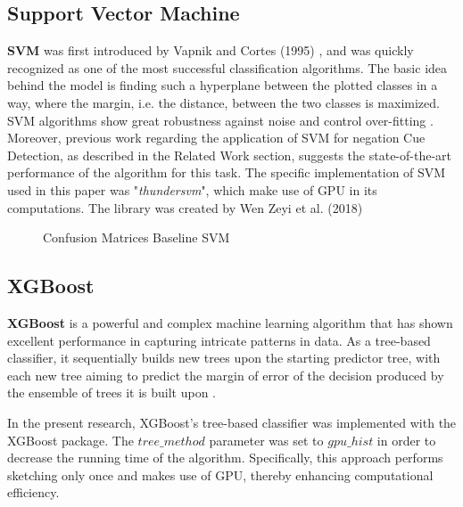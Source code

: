 \subsection{Support Vector Machine} 
\textbf{SVM} was first introduced by Vapnik and Cortes (1995) \cite{vapnik1995}, and was quickly recognized as one of the most successful classification algorithms. The basic idea behind the model is finding such a hyperplane between the plotted classes in a way, where the margin, i.e. the distance, between the two classes is maximized. SVM algorithms show great robustness against noise and control over-fitting \cite{robust2009}. Moreover, previous work regarding the application of SVM for negation Cue Detection, as described in the Related Work section, suggests the state-of-the-art performance of the algorithm for this task. The specific implementation of SVM used in this paper was  "\textit{thundersvm}", which make use of GPU in its computations. The library was created by Wen Zeyi et al. (2018) \cite{thundersvm}

\begin{figure}[!ht]
\centering
  \caption{Confusion Matrices Baseline SVM}
  \label{fig:base_line_svm}
\end{figure}

\subsection{XGBoost}
\textbf{XGBoost} is a powerful and complex machine learning algorithm that has shown excellent performance in capturing intricate patterns in data. As a tree-based classifier, it sequentially builds new trees upon the starting predictor tree, with each new tree aiming to predict the margin of error of the decision produced by the ensemble of trees it is built upon \cite{minasny2009elements}.

In the present research, XGBoost's tree-based classifier was implemented with the XGBoost package. The $tree\_method$ parameter was set to $gpu\_hist$ in order to decrease the running time of the algorithm. Specifically, this approach performs sketching only once and makes use of GPU, thereby enhancing computational efficiency.

